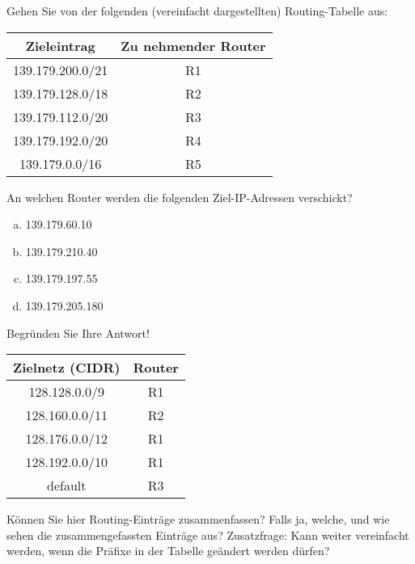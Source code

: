 
Gehen Sie von der folgenden (vereinfacht dargestellten) Routing-Tabelle aus:

\begin{center}
    \begin{tabular}{|c | c|}
        \hline
        Zieleintrag      & Zu nehmender Router \\
        \hline
        139.179.200.0/21 & R1                  \\
        139.179.128.0/18 & R2                  \\
        139.179.112.0/20 & R3                  \\
        139.179.192.0/20 & R4                  \\
        139.179.0.0/16   & R5                  \\
        \hline
    \end{tabular}
\end{center}

An welchen Router werden die folgenden Ziel-IP-Adressen verschickt?

\begin{enumerate}[(a)]
    \item 139.179.60.10
    \item 139.179.210.40
    \item 139.179.197.55
    \item 139.179.205.180
\end{enumerate}

Begründen Sie Ihre Antwort!


\begin{center}
    \begin{tabular}{|c | c|}
        \hline
        Zielnetz (CIDR) & Router \\
        \hline
        128.128.0.0/9   & R1     \\
        128.160.0.0/11  & R2     \\
        128.176.0.0/12  & R1     \\
        128.192.0.0/10  & R1     \\
        default         & R3     \\
        \hline
    \end{tabular}
\end{center}

Können Sie hier Routing-Einträge zusammenfassen?
Falls ja, welche, und wie sehen die zusammengefassten Einträge aus?
Zusatzfrage:
Kann weiter vereinfacht werden, wenn die Präfixe in der Tabelle geändert werden dürfen?